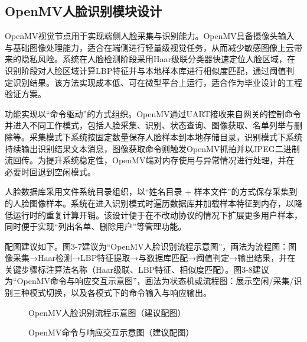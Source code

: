 \subsection{OpenMV人脸识别模块设计}
\par OpenMV视觉节点用于实现端侧人脸采集与识别能力。OpenMV具备摄像头输入与基础图像处理能力，适合在端侧进行轻量级视觉任务，从而减少敏感图像上云带来的隐私风险。系统在人脸检测阶段采用Haar级联分类器快速定位人脸区域，在识别阶段对人脸区域计算LBP特征并与本地样本库进行相似度匹配，通过阈值判定识别结果。该方法实现成本低、可在微型平台上运行，适合作为毕业设计的工程验证方案。
\par 功能实现以“命令驱动”的方式组织。OpenMV通过UART接收来自网关的控制命令并进入不同工作模式，包括人脸采集、识别、状态查询、图像获取、名单列举与删除等。采集模式下系统按固定数量保存人脸样本到本地存储目录，识别模式下系统持续输出识别结果文本消息，图像获取命令则触发OpenMV抓拍并以JPEG二进制流回传。为提升系统稳定性，OpenMV端对内存使用与异常情况进行处理，并在必要时回退到空闲模式。
\par 人脸数据库采用文件系统目录组织，以“姓名目录 + 样本文件”的方式保存采集到的人脸图像样本。系统在进入识别模式时遍历数据库并加载样本特征到内存，以降低运行时的重复计算开销。该设计便于在不改动协议的情况下扩展更多用户样本，同时便于实现“列出名单、删除用户”等管理功能。

\par 配图建议如下。图3-7建议为“OpenMV人脸识别流程示意图”，画法为流程图：图像采集→Haar检测→LBP特征提取→与数据库匹配→阈值判定→输出结果，并在关键步骤标注算法名称（Haar级联、LBP特征、相似度匹配）。图3-8建议为“OpenMV命令与响应交互示意图”，画法为状态机或流程图：展示空闲/采集/识别三种模式切换，以及各模式下的命令输入与响应输出。
\begin{figure}[H]
\centering
{}
\caption{OpenMV人脸识别流程示意图（建议配图）}
\label{fig:openmv_flow}
\end{figure}
\begin{figure}[H]
\centering
{}
\caption{OpenMV命令与响应交互示意图（建议配图）}
\label{fig:openmv_commands}
\end{figure}

